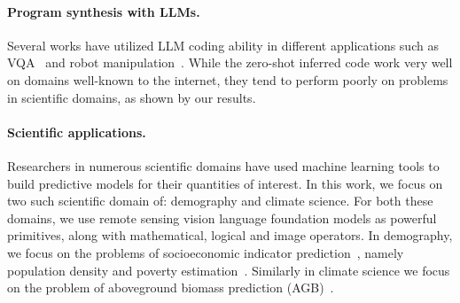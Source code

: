 \paragraph{Program synthesis with LLMs.}
Several works have utilized LLM coding ability in different applications such as VQA~\citep{suris-23, gupta2022visual} and robot manipulation~\citep{liang2023code}. 
While the zero-shot inferred code work very well on domains well-known to the internet, they tend to perform poorly on problems in scientific domains, as shown by our results. 

\paragraph{Scientific applications.}
Researchers in numerous scientific domains have used machine learning tools to build predictive models for their quantities of interest. 
In this work, we focus on two such scientific domain of: demography and climate science.
For both these domains, we use remote sensing vision language foundation models as powerful primitives, along with mathematical, logical and image operators.
In demography, we focus on the problems of socioeconomic indicator prediction~\citep{yong-24}, namely population density and poverty estimation~\citep{metzger-24,xie2017mapping}.
Similarly in climate science we focus on the problem of aboveground biomass prediction (AGB)~\citep{nathaniel2023above}.
